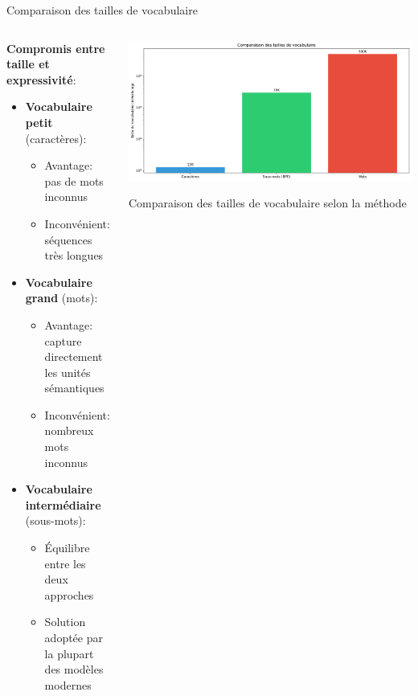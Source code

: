 \documentclass[aspectratio=169,11pt]{beamer}
\begin{document}
\begin{frame}{Comparaison des tailles de vocabulaire}
    \begin{columns}
        \begin{column}{0.5\textwidth}
            \textbf{Compromis entre taille et expressivité}:
            \begin{itemize}
                \item \textbf{Vocabulaire petit} (caractères):
                \begin{itemize}
                    \item Avantage: pas de mots inconnus
                    \item Inconvénient: séquences très longues
                \end{itemize}
                \vspace{0.3cm}
                \item \textbf{Vocabulaire grand} (mots):
                \begin{itemize}
                    \item Avantage: capture directement les unités sémantiques
                    \item Inconvénient: nombreux mots inconnus
                \end{itemize}
                \vspace{0.3cm}
                \item \textbf{Vocabulaire intermédiaire} (sous-mots):
                \begin{itemize}
                    \item Équilibre entre les deux approches
                    \item Solution adoptée par la plupart des modèles modernes
                \end{itemize}
            \end{itemize}
        \end{column}
        \begin{column}{0.5\textwidth}
            \includegraphics[width=\textwidth]{images/generated/vocab_size_comparison.png}
            \vspace{0.2cm}
            \begin{center}
                \small{Comparaison des tailles de vocabulaire selon la méthode}
            \end{center}
        \end{column}
    \end{columns}
\end{frame}
\end{document}
